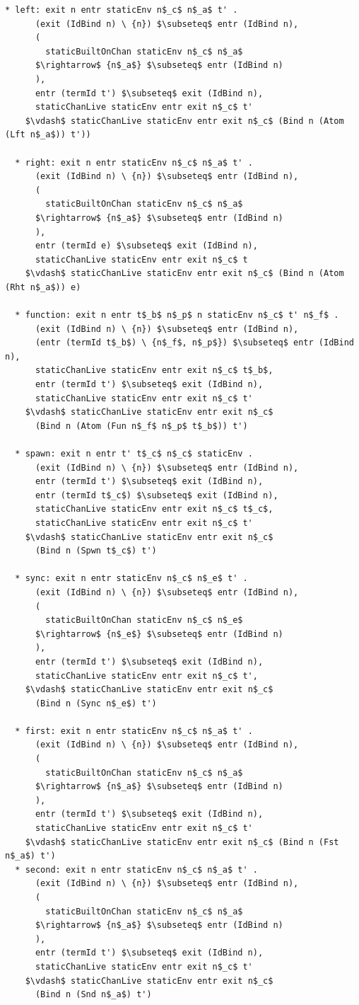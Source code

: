 \documentclass[letterpaper, 11pt]{report}
\begin{document}
\begin{lstlisting}[language=logic, mathescape]
  * left: exit n entr staticEnv n$_c$ n$_a$ t' . 
      (exit (IdBind n) \ {n}) $\subseteq$ entr (IdBind n),
      (
        staticBuiltOnChan staticEnv n$_c$ n$_a$
      $\rightarrow$ {n$_a$} $\subseteq$ entr (IdBind n)
      ),
      entr (termId t') $\subseteq$ exit (IdBind n),
      staticChanLive staticEnv entr exit n$_c$ t'
    $\vdash$ staticChanLive staticEnv entr exit n$_c$ (Bind n (Atom (Lft n$_a$)) t'))

  * right: exit n entr staticEnv n$_c$ n$_a$ t' . 
      (exit (IdBind n) \ {n}) $\subseteq$ entr (IdBind n),
      (
        staticBuiltOnChan staticEnv n$_c$ n$_a$
      $\rightarrow$ {n$_a$} $\subseteq$ entr (IdBind n)
      ),
      entr (termId e) $\subseteq$ exit (IdBind n),
      staticChanLive staticEnv entr exit n$_c$ t
    $\vdash$ staticChanLive staticEnv entr exit n$_c$ (Bind n (Atom (Rht n$_a$)) e)

  * function: exit n entr t$_b$ n$_p$ n staticEnv n$_c$ t' n$_f$ . 
      (exit (IdBind n) \ {n}) $\subseteq$ entr (IdBind n),
      (entr (termId t$_b$) \ {n$_f$, n$_p$}) $\subseteq$ entr (IdBind n),
      staticChanLive staticEnv entr exit n$_c$ t$_b$,
      entr (termId t') $\subseteq$ exit (IdBind n),
      staticChanLive staticEnv entr exit n$_c$ t'
    $\vdash$ staticChanLive staticEnv entr exit n$_c$
      (Bind n (Atom (Fun n$_f$ n$_p$ t$_b$)) t')

  * spawn: exit n entr t' t$_c$ n$_c$ staticEnv .
      (exit (IdBind n) \ {n}) $\subseteq$ entr (IdBind n),
      entr (termId t') $\subseteq$ exit (IdBind n),
      entr (termId t$_c$) $\subseteq$ exit (IdBind n),
      staticChanLive staticEnv entr exit n$_c$ t$_c$,
      staticChanLive staticEnv entr exit n$_c$ t'
    $\vdash$ staticChanLive staticEnv entr exit n$_c$
      (Bind n (Spwn t$_c$) t')

  * sync: exit n entr staticEnv n$_c$ n$_e$ t' .
      (exit (IdBind n) \ {n}) $\subseteq$ entr (IdBind n),
      (
        staticBuiltOnChan staticEnv n$_c$ n$_e$
      $\rightarrow$ {n$_e$} $\subseteq$ entr (IdBind n)
      ),
      entr (termId t') $\subseteq$ exit (IdBind n),
      staticChanLive staticEnv entr exit n$_c$ t',
    $\vdash$ staticChanLive staticEnv entr exit n$_c$
      (Bind n (Sync n$_e$) t')

  * first: exit n entr staticEnv n$_c$ n$_a$ t' .
      (exit (IdBind n) \ {n}) $\subseteq$ entr (IdBind n),
      (
        staticBuiltOnChan staticEnv n$_c$ n$_a$
      $\rightarrow$ {n$_a$} $\subseteq$ entr (IdBind n)
      ),
      entr (termId t') $\subseteq$ exit (IdBind n),
      staticChanLive staticEnv entr exit n$_c$ t'
    $\vdash$ staticChanLive staticEnv entr exit n$_c$ (Bind n (Fst n$_a$) t')
  * second: exit n entr staticEnv n$_c$ n$_a$ t' .
      (exit (IdBind n) \ {n}) $\subseteq$ entr (IdBind n),
      (
        staticBuiltOnChan staticEnv n$_c$ n$_a$
      $\rightarrow$ {n$_a$} $\subseteq$ entr (IdBind n)
      ),
      entr (termId t') $\subseteq$ exit (IdBind n),
      staticChanLive staticEnv entr exit n$_c$ t'
    $\vdash$ staticChanLive staticEnv entr exit n$_c$
      (Bind n (Snd n$_a$) t')


\end{lstlisting}
\end{document}
